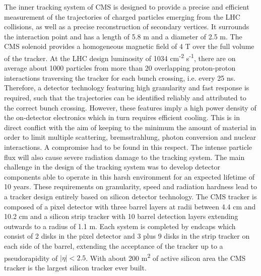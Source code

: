 The inner tracking system of CMS is designed to provide a precise and efficient measurement
of the trajectories of charged particles emerging from the LHC collisions, as well as a precise
reconstruction of secondary vertices. It surrounds the interaction point and has a length of 5.8 m
and a diameter of 2.5 m. The CMS solenoid provides a homogeneous magnetic field of 4 T over
the full volume of the tracker.
At the LHC design luminosity of 1034 cm\textsuperscript{-2} s\textsuperscript{-1},
there are on average about 1000 particles from more than 20 overlapping proton-proton interactions traversing
the tracker for each bunch crossing, i.e. every 25 ns. Therefore, a detector technology featuring high
granularity and fast response is required, such that the trajectories can be identified reliably and
attributed to the correct bunch crossing. However, these features imply a high power density of
the on-detector electronics which in turn requires efficient cooling. This is in direct conflict with
the aim of keeping to the minimum the amount of material in order to limit multiple scattering,
bremsstrahlung, photon conversion and nuclear interactions. A compromise had to be found in this
respect. The intense particle flux will also cause severe radiation damage to the tracking system.
The main challenge in the design of the tracking system was to develop detector components able
to operate in this harsh environment for an expected lifetime of 10 years. These requirements on
granularity, speed and radiation hardness lead to a tracker design entirely based on silicon detector
technology. The CMS tracker is composed of a pixel detector with three barrel layers at radii
between 4.4 cm and 10.2 cm and a silicon strip tracker with 10 barrel detection layers extending
outwards to a radius of 1.1 m. Each system is completed by endcaps which consist of 2 disks in
the pixel detector and 3 plus 9 disks in the strip tracker on each side of the barrel, extending the
acceptance of the tracker up to a pseudorapidity of $|\eta| < 2.5$. With about 200 m\textsuperscript{2} of active silicon
area the CMS tracker is the largest silicon tracker ever built.

